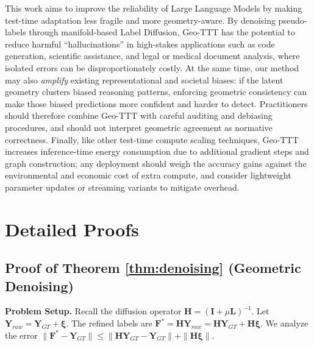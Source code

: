 \documentclass{article}
\theoremstyle{plain}
\theoremstyle{definition}
\theoremstyle{remark}
\newcommand{\Lap}{\mathbf{L}}      %
\newcommand{\F}{\mathbf{F}}        %
\newcommand{\Y}{\mathbf{Y}}        %
\begin{document}
This work aims to improve the reliability of Large Language Models by making test-time adaptation less fragile and more geometry-aware. By denoising pseudo-labels through manifold-based Label Diffusion, Geo-TTT has the potential to reduce harmful ``hallucinations'' in high-stakes applications such as code generation, scientific assistance, and legal or medical document analysis, where isolated errors can be disproportionately costly. At the same time, our method may also \emph{amplify} existing representational and societal biases: if the latent geometry clusters biased reasoning patterns, enforcing geometric consistency can make those biased predictions more confident and harder to detect. Practitioners should therefore combine Geo-TTT with careful auditing and debiasing procedures, and should not interpret geometric agreement as normative correctness. Finally, like other test-time compute scaling techniques, Geo-TTT increases inference-time energy consumption due to additional gradient steps and graph construction; any deployment should weigh the accuracy gains against the environmental and economic cost of extra compute, and consider lightweight parameter updates or streaming variants to mitigate overhead.




\clearpage
\appendix
\onecolumn

\section{Detailed Proofs}
\label{app:proofs}

\subsection{Proof of Theorem \ref{thm:denoising} (Geometric Denoising)}

\textbf{Problem Setup.}
Recall the diffusion operator $\mathbf{H} = (\mathbf{I} + \mu \Lap)^{-1}$. Let $\Y_{raw} = \Y_{GT} + \boldsymbol{\xi}$. The refined labels are $\F^* = \mathbf{H} \Y_{raw} = \mathbf{H} \Y_{GT} + \mathbf{H} \boldsymbol{\xi}$.
We analyze the error $\|\F^* - \Y_{GT}\| \le \|\mathbf{H} \Y_{GT} - \Y_{GT}\| + \|\mathbf{H} \boldsymbol{\xi}\|$.
\end{document}
